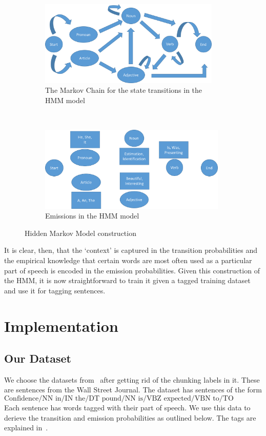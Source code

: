 \documentclass[11pt]{article}
\begin{document}
\begin{figure}[!t]
\begin{subfigure}[t]{0.5\textwidth}
	\centering
	\includegraphics[height=1.6in]{hmm-trans}
	\caption{The Markov Chain for the state transitions in the HMM model}
	\label{fig:hmm-trans}
\end{subfigure}~
\begin{subfigure}[t]{0.5\textwidth}
	\centering
	\includegraphics[height=1.6in]{hmm-emis}
	\caption{Emissions in the HMM model}
	\label{fig:hmm-emis}
\end{subfigure}
\caption{Hidden Markov Model construction}
\label{fig:hmm}
\end{figure}

It is clear, then, that the `context' is captured in the transition probabilities and the empirical knowledge that certain words are most often used as a particular part of speech is encoded in the emission probabilities. Given this construction of the HMM, it is now straightforward to train it given a tagged training dataset and use it for tagging sentences. 

\section{Implementation}

\subsection{Our Dataset}
We choose the datasets from~\cite{dataset} after getting rid of the chunking labels in it. These are sentences from the Wall Street Journal. The dataset has sentences of the form
%
$$\text{Confidence/NN in/IN the/DT pound/NN is/VBZ expected/VBN to/TO take/VB a/DT sharp/JJ dive/NN}$$
%
Each sentence has words tagged with their part of speech. We use this data to derieve the transition and emission probabilities as outlined below. The tags are explained in~\cite{tags}.
\end{document}
